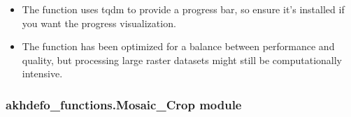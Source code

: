 \documentclass[letterpaper,10pt,english]{sphinxmanual}
\begin{document}
\begin{fulllineitems}
\begin{description}
\begin{itemize}
\item {} 
\sphinxAtStartPar
The function uses tqdm to provide a progress bar, so ensure it’s installed if you want the progress visualization.

\item {} 
\sphinxAtStartPar
The function has been optimized for a balance between performance and quality, but processing large raster datasets
might still be computationally intensive.

\end{itemize}

\end{description}

\end{fulllineitems}



\subsubsection{akhdefo\_functions.Mosaic\_Crop module}
\label{\detokenize{akhdefo_functions:module-akhdefo_functions.Mosaic_Crop}}\label{\detokenize{akhdefo_functions:akhdefo-functions-mosaic-crop-module}}
\end{document}
